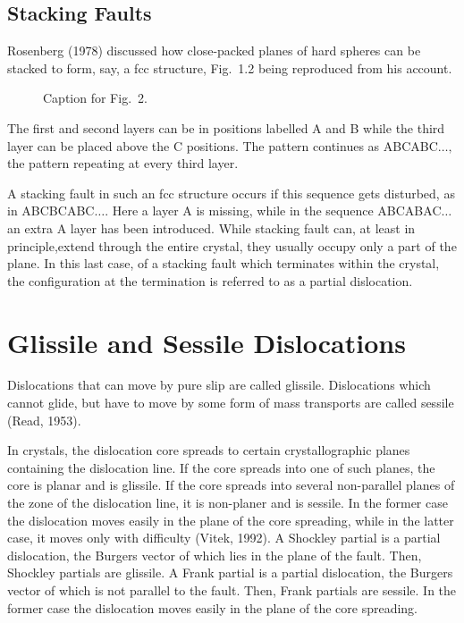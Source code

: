 \begin{appendix}
\section{Stacking Faults}  %
Rosenberg (1978) discussed how close-packed planes of hard spheres 
can be stacked to form, say, a fcc structure, Fig.~1.2 being reproduced 
from his account.

\begin{figure}%
{}
\caption{Caption for Fig.~2.}
\end{figure}

The first and second layers can be in positions labelled A and B 
while the third layer can be placed above the C positions. The pattern 
continues as ABCABC$\ldots,$ the pattern repeating at every third layer.

A stacking fault in such an fcc structure occurs if this sequence 
gets disturbed, as in ABCBCABC$\ldots.$ Here a layer A is missing, while in 
the sequence ABCABAC$\ldots$ an extra A layer has been introduced. While 
stacking fault can, at least in principle,extend through the entire 
crystal, they usually occupy only a part of the plane. In this last 
case, of a stacking fault which terminates within the crystal, the 
configuration at the termination is referred to as a partial dislocation.

\chapter{Glissile and Sessile Dislocations}  %

Dislocations that can move by pure slip are called glissile. 
Dislocations which cannot glide, but have to move by some form of mass 
transports are called sessile (Read, 1953).

In crystals, the dislocation core spreads to certain crystallographic
planes containing the dislocation line. If the core spreads into one
of such planes, the core is planar and is glissile. If the core
spreads into several non-parallel planes of the zone of the
dislocation line, it is non-planer and is sessile. In the former case
the dislocation moves easily in the plane of the core spreading, while
in the latter case, it moves only with difficulty (Vitek, 1992). A
Shockley partial is a partial dislocation, the Burgers vector of which
lies in the plane of the fault. Then, Shockley partials are
glissile. A Frank partial is a partial dislocation, the Burgers vector
of which is not parallel to the fault. Then, Frank partials are
sessile. In the former case the dislocation moves easily in the plane
of the core spreading.


\end{appendix}
